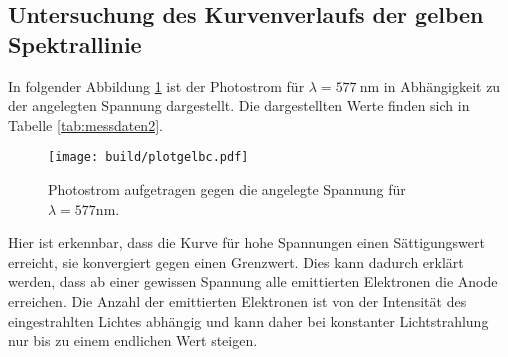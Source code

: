 \subsection{Untersuchung des Kurvenverlaufs der gelben Spektrallinie}
In folgender Abbildung \ref{fig:plotgelbc} ist der Photostrom für $\lambda = \SI{577}{\nano\meter}$ in
Abhängigkeit zu der angelegten Spannung dargestellt. Die dargestellten Werte finden
sich in Tabelle \ref{tab:messdaten2}.
\begin{figure}[H]
  \centering
  \texttt{[image: build/plotgelbc.pdf]}
  \caption{Photostrom aufgetragen gegen die angelegte Spannung für $\lambda = 577 \si{\nano\meter}$.}
  \label{fig:plotgelbc}
\end{figure}
\noindent
Hier ist erkennbar, dass die Kurve für hohe Spannungen einen Sättigungswert erreicht,
sie konvergiert gegen einen Grenzwert. Dies kann dadurch erklärt werden, dass ab
einer gewissen Spannung alle emittierten Elektronen die Anode erreichen. Die Anzahl
der emittierten Elektronen ist von der Intensität des eingestrahlten Lichtes abhängig
und kann daher bei konstanter Lichtstrahlung nur bis zu einem endlichen Wert steigen.
